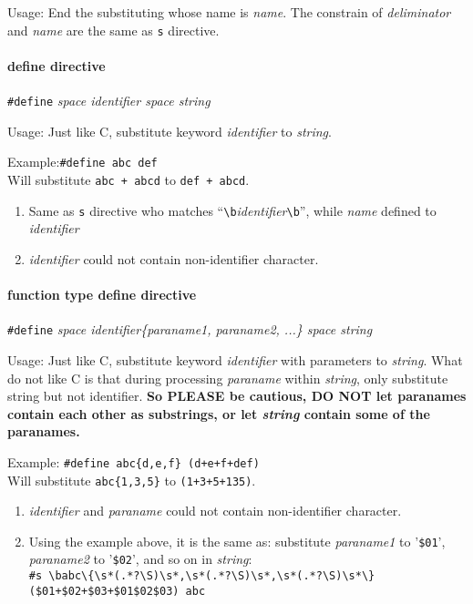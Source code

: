 \documentclass{article}
\begin{document}
Usage: End the substituting whose name is \textit{name}. The constrain of \textit{deliminator} and \textit{name} are the same as \verb|s| directive.

\paragraph{define directive} \verb|#define| \textit{space identifier space string}

Usage: Just like C, substitute keyword \textit{identifier} to \textit{string}.

Example:\verb|#define abc def| \\ Will substitute \verb|abc + abcd| to \verb|def + abcd|.

\begin{enumerate}
	\item Same as \verb|s| directive who matches ``\verb|\b|\textit{identifier}\verb|\b|'', while \textit{name} defined to \textit{identifier}
	\item \textit{identifier} could not contain non-identifier character.
\end{enumerate}

\paragraph{function type define directive} \verb|#define| \textit{space identifier\{paraname1, paraname2, ...\} space string}

Usage: Just like C, substitute keyword \textit{identifier} with parameters to \textit{string}. What do not like C is that during processing \textit{paraname} within \textit{string}, only substitute string but not identifier. \textbf{So PLEASE be cautious, DO NOT let paranames contain each other as substrings, or let \textit{string} contain some of the paranames.}

Example: \verb|#define abc{d,e,f} (d+e+f+def)| \\ Will substitute \verb|abc{1,3,5}| to \verb|(1+3+5+135)|.

\begin{enumerate}
	\item \textit{identifier} and \textit{paraname} could not contain non-identifier character.
	\item Using the example above, it is the same as: substitute \textit{paraname1} to '\verb|$01|', \textit{paraname2} to '\verb|$02|', and so on in \textit{string}: \\
	\verb|#s \babc\{\s*(.*?\S)\s*,\s*(.*?\S)\s*,\s*(.*?\S)\s*\} ($01+$02+$03+$01$02$03) abc|
\end{enumerate}
\end{document}
